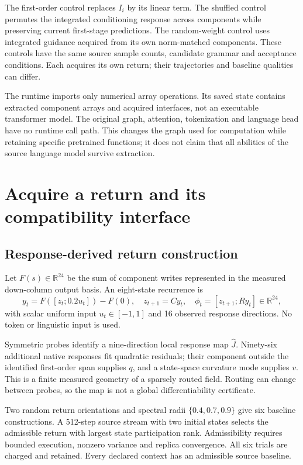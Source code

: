 \documentclass[11pt]{article}
\begin{document}
The first-order control replaces $I_i$ by its linear term. The shuffled control permutes the integrated conditioning response across components while preserving current first-stage predictions. The random-weight control uses integrated guidance acquired from its own norm-matched components. These controls have the same source sample counts, candidate grammar and acceptance conditions. Each acquires its own return; their trajectories and baseline qualities can differ.

The runtime imports only numerical array operations. Its saved state contains extracted component arrays and acquired interfaces, not an executable transformer model. The original graph, attention, tokenization and language head have no runtime call path. This changes the graph used for computation while retaining specific pretrained functions; it does not claim that all abilities of the source language model survive extraction.

\section{Acquire a return and its compatibility interface}
\subsection{Response-derived return construction}
Let $F(s)\in\mathbb R^{24}$ be the sum of component writes represented in the measured down-column output basis. An eight-state recurrence is
\begin{equation}
 y_t=F([z_t;0.2u_t])-F(0),\quad z_{t+1}=Cy_t,\quad
 \phi_t=[z_{t+1};Ry_t]\in\mathbb R^{24},
\end{equation}
with scalar uniform input $u_t\in[-1,1]$ and 16 observed response directions. No token or linguistic input is used.

Symmetric probes identify a nine-direction local response map $\widehat J$. Ninety-six additional native responses fit quadratic residuals; their component outside the identified first-order span supplies $q$, and a state-space curvature mode supplies $v$. This is a finite measured geometry of a sparsely routed field. Routing can change between probes, so the map is not a global differentiability certificate.

Two random return orientations and spectral radii $\{0.4,0.7,0.9\}$ give six baseline constructions. A 512-step source stream with two initial states selects the admissible return with largest state participation rank. Admissibility requires bounded execution, nonzero variance and replica convergence. All six trials are charged and retained. Every declared context has an admissible source baseline.
\end{document}
